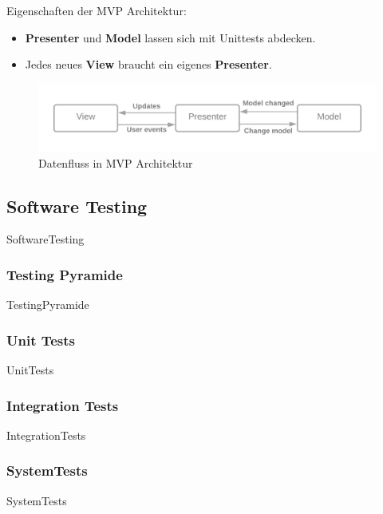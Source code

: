 \documentclass{article}
\begin{document}
            Eigenschaften der MVP Architektur:
            \begin{itemize}
                \item \textbf{Presenter} und \textbf{Model} lassen sich mit Unittests abdecken.
                \item Jedes neues \textbf{View} braucht ein eigenes \textbf{Presenter}.
            \end{itemize}


            \begin{figure}[H]
                \centering
                \includegraphics[width=1\textwidth]{./images/MVP.png}
                \caption[Datenfluss in MVP Architektur]{Datenfluss in MVP Architektur \footnotemark}
                \label{fig:MVP}
            \end{figure}



    \subsection{Software Testing}
        {SoftwareTesting}

        \subsubsection{Testing Pyramide}
            {TestingPyramide}
        
        \subsubsection{Unit Tests}
            {UnitTests}
        
        \subsubsection{Integration Tests}
            {IntegrationTests}

        \subsubsection{SystemTests}
            {SystemTests}
\end{document}
